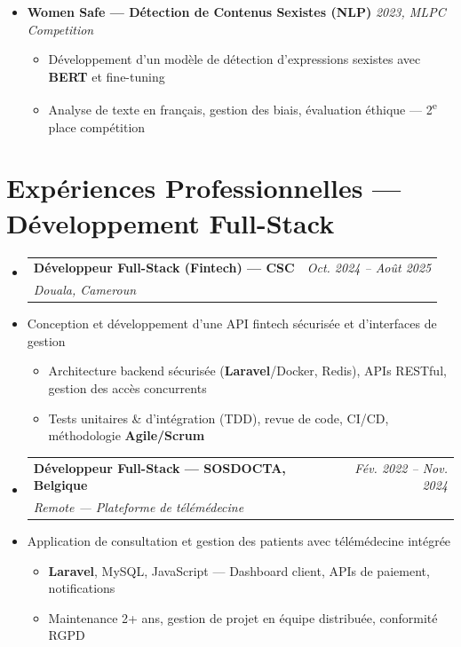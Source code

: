 \documentclass[a4paper,11pt]{article}
\makeatletter
\newcommand{\resumeItem}[1]{\item\small{#1}}
\newcommand{\resumeSubheading}[4]{
  \vspace{-1pt}\item
    \begin{tabular*}{0.97\textwidth}[t]{l@{\extracolsep{\fill}}r}
      \textbf{#1} & \textit{\small #2} \\
      \textit{\small #3} & \textit{\small #4} \\
    \end{tabular*}\vspace{-5pt}
}
\makeatother
\begin{document}
\begin{itemize}[leftmargin=*, label={}]
    \item \textbf{Women Safe — Détection de Contenus Sexistes (NLP)} \hfill \textit{2023, MLPC Competition}
    \vspace{-2pt}
    \begin{itemize}[leftmargin=0.4cm, nosep, label=\tiny$\bullet$]
        \item \small{Développement d'un modèle de détection d'expressions sexistes avec \textbf{BERT} et fine-tuning}
        \item \small{Analyse de texte en français, gestion des biais, évaluation éthique — 2\textsuperscript{e} place compétition}
    \end{itemize}

\end{itemize}

\section{Expériences Professionnelles — Développement Full-Stack}
\begin{itemize}[leftmargin=*, label={}]

    \resumeSubheading
      {Développeur Full-Stack (Fintech) — CSC}{Oct. 2024 -- Août 2025}
      {Douala, Cameroun}{}
      \resumeItem{Conception et développement d'une API fintech sécurisée et d'interfaces de gestion}
      \begin{itemize}[leftmargin=0.4cm, nosep, label=\tiny$\bullet$]
        \item \small{Architecture backend sécurisée (\textbf{Laravel}/Docker, Redis), APIs RESTful, gestion des accès concurrents}
        \item \small{Tests unitaires \& d'intégration (TDD), revue de code, CI/CD, méthodologie \textbf{Agile/Scrum}}
      \end{itemize}
    \vspace{2pt}

    \resumeSubheading
      {Développeur Full-Stack — SOSDOCTA, Belgique}{Fév. 2022 -- Nov. 2024}
      {Remote — Plateforme de télémédecine}{}
      \resumeItem{Application de consultation et gestion des patients avec télémédecine intégrée}
      \begin{itemize}[leftmargin=0.4cm, nosep, label=\tiny$\bullet$]
        \item \small{\textbf{Laravel}, MySQL, JavaScript — Dashboard client, APIs de paiement, notifications}
        \item \small{Maintenance 2+ ans, gestion de projet en équipe distribuée, conformité RGPD}
      \end{itemize}
\end{itemize}
\end{document}
